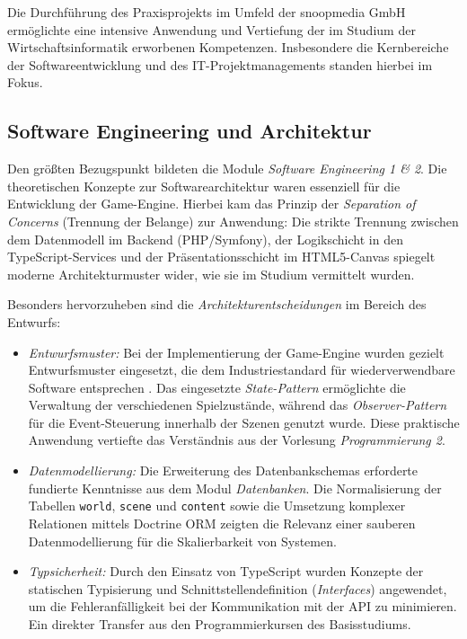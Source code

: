 Die Durchführung des Praxisprojekts im Umfeld der snoopmedia GmbH ermöglichte eine intensive Anwendung und Vertiefung der im Studium der Wirtschaftsinformatik erworbenen Kompetenzen. 
Insbesondere die Kernbereiche der Softwareentwicklung und des IT-Projektmanagements standen hierbei im Fokus.

\subsection{Software Engineering und Architektur}
Den größten Bezugspunkt bildeten die Module \textit{Software Engineering 1 \& 2}. Die theoretischen Konzepte zur Softwarearchitektur waren essenziell für die Entwicklung der Game-Engine.
 Hierbei kam das Prinzip der \textit{Separation of Concerns} (Trennung der Belange) zur Anwendung: Die strikte Trennung zwischen dem Datenmodell im Backend (PHP/Symfony), der 
 Logikschicht in den TypeScript-Services und der Präsentationsschicht im HTML5-Canvas spiegelt moderne Architekturmuster wider, wie sie im Studium vermittelt wurden.

Besonders hervorzuheben sind die \textit{Architekturentscheidungen} im Bereich des Entwurfs:
\begin{itemize}
    \item \textit{Entwurfsmuster:} Bei der Implementierung der Game-Engine wurden gezielt Entwurfsmuster eingesetzt, die dem Industriestandard für wiederverwendbare Software entsprechen 
    \cite{Gamma1994}. Das eingesetzte \textit{State-Pattern} ermöglichte die Verwaltung der verschiedenen Spielzustände, während das \textit{Observer-Pattern} für die Event-Steuerung 
    innerhalb der Szenen genutzt wurde. Diese praktische Anwendung vertiefte das Verständnis aus der Vorlesung \textit{Programmierung 2}.
    \item \textit{Datenmodellierung:} Die Erweiterung des Datenbankschemas erforderte fundierte Kenntnisse aus dem Modul \textit{Datenbanken}. Die Normalisierung der Tabellen 
    \texttt{world}, \texttt{scene} und \texttt{content} sowie die Umsetzung komplexer Relationen mittels Doctrine ORM zeigten die Relevanz einer sauberen Datenmodellierung für 
    die Skalierbarkeit von Systemen.
    \item \textit{Typsicherheit:} Durch den Einsatz von TypeScript wurden Konzepte der statischen Typisierung und Schnittstellendefinition (\textit{Interfaces}) angewendet, um die 
    Fehleranfälligkeit bei der Kommunikation mit der API zu minimieren. Ein direkter Transfer aus den Programmierkursen des Basisstudiums.
\end{itemize}


